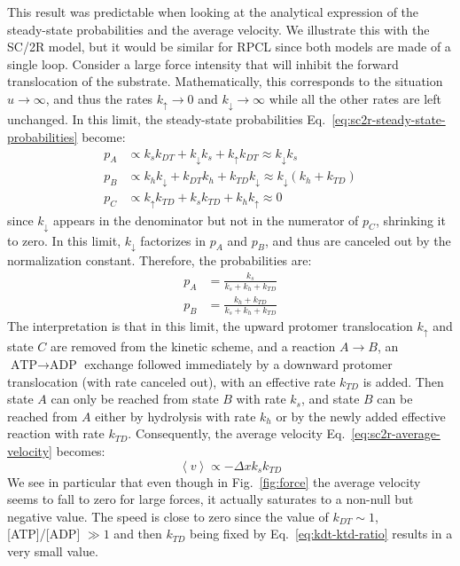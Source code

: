     This result was predictable when looking at the analytical expression of the steady-state probabilities and the average velocity. We illustrate this with the SC/2R model, but it would be similar for RPCL since both models are made of a single loop. Consider a large force intensity that will inhibit the forward translocation of the substrate. Mathematically, this corresponds to the situation $u \rightarrow \infty$, and thus the rates $k_\uparrow \rightarrow 0$ and $k_\downarrow \rightarrow\infty$ while all the other rates are left unchanged. In this limit, the steady-state probabilities Eq.~\eqref{eq:sc2r-steady-state-probabilities} become:
    \begin{equation}
    \begin{split}
        p_A &\propto k_s k_{DT} + k_\downarrow k_s + k_\uparrow k_{DT} 
            \approx k_\downarrow k_s \\
        p_B &\propto k_h k_\downarrow + k_{DT} k_h + k_{TD} k_\downarrow 
            \approx k_\downarrow (k_h + k_{TD}) \\
        p_C &\propto k_\uparrow k_{TD} + k_s k_{TD} + k_h k_\uparrow
            \approx 0
    \end{split}
    \end{equation}
    since $k_\downarrow$ appears in the denominator but not in the numerator of $p_C$, shrinking it to zero. In this limit, $k_\downarrow$ factorizes in $p_A$ and $p_B$, and thus are canceled out by the normalization constant. Therefore, the probabilities are:
    \begin{equation}
    \begin{split}
        p_A &= \frac{k_s}{k_s + k_h + k_{TD}} \\
        p_B &= \frac{k_h + k_{TD}}{k_s + k_h + k_{TD}}
    \end{split}
    \end{equation}
    The interpretation is that in this limit, the upward protomer translocation $k_\uparrow$ and state $C$ are removed from the kinetic scheme, and a reaction $A\to B$, an $\text{ATP}\to\text{ADP}$ exchange followed immediately by a downward protomer translocation (with rate canceled out), with an effective rate $k_{TD}$ is added. Then state $A$ can only be reached from state $B$ with rate $k_s$, and state $B$ can be reached from $A$ either by hydrolysis with rate $k_h$ or by the newly added effective reaction with rate $k_{TD}$. Consequently, the average velocity Eq.~\eqref{eq:sc2r-average-velocity} becomes:
    \begin{equation}
        \left\langle v \right\rangle \propto - \Delta x k_s k_{TD}
    \end{equation}
    We see in particular that even though in Fig.~\ref{fig:force} the average velocity seems to fall to zero for large forces, it actually saturates to a non-null but negative value. The speed is close to zero since the value of $k_{DT} \sim 1$, [ATP]/[ADP] $\gg 1$ and then $k_{TD}$ being fixed by Eq.~\eqref{eq:kdt-ktd-ratio} results in a very small value.
    
